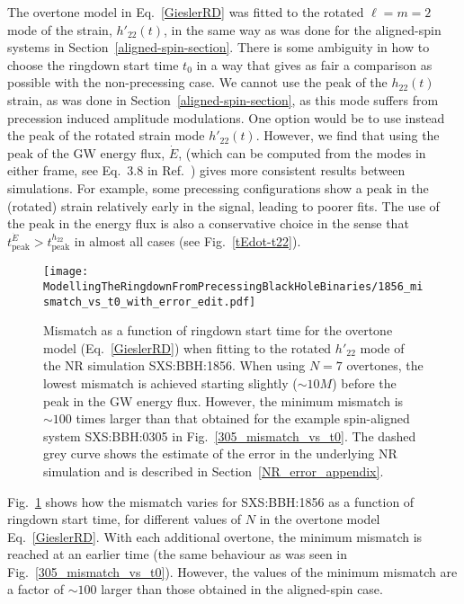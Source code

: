 The overtone model in Eq.~\ref{GieslerRD} was fitted to the rotated $\ell=m=2$ mode of the strain, $h'_{22}(t)$, in the same way as was done for the aligned-spin systems in Section~\ref{aligned-spin-section}.
There is some ambiguity in how to choose the ringdown start time $t_0$ in a way that gives as fair a comparison as possible with the non-precessing case. 
We cannot use the peak of the $h_{22}(t)$ strain, as was done in Section~\ref{aligned-spin-section}, as this mode suffers from precession induced amplitude modulations. 
One option would be to use instead the peak of the rotated strain mode $h'_{22}(t)$.
However, we find that using the peak of the GW energy flux, $\dot{E}$, (which can be computed from the modes in either frame, see Eq.~3.8 in Ref.~\cite{Ruiz:2007yx}) gives more consistent results between simulations. For example, some precessing configurations show a peak in the (rotated) strain relatively early in the signal, leading to poorer fits.
The use of the peak in the energy flux is also a conservative choice in the sense that $t_{\mathrm{peak}}^{\dot{E}} > t_{\mathrm{peak}}^{h_{22}}$ in almost all cases (see Fig.~\ref{tEdot-t22}).

\begin{figure}[t]
    \centering
    \texttt{[image: ModellingTheRingdownFromPrecessingBlackHoleBinaries/1856\_mismatch\_vs\_t0\_with\_error\_edit.pdf]}
    \caption[Mismatch as a function of ringdown start time for an overtone model fitted to SXS:BBH:1856]{
    Mismatch as a function of ringdown start time for the overtone model (Eq.~\ref{GieslerRD}) when fitting to the rotated $h'_{22}$ mode of the NR simulation SXS:BBH:1856.
    When using $N=7$ overtones, the lowest mismatch is achieved starting slightly ($\sim 10M$) before the peak in the GW energy flux.
    However, the minimum mismatch is $\sim 100$ times larger than that obtained for the example spin-aligned system SXS:BBH:0305 in Fig.~\ref{305_mismatch_vs_t0}. 
    The dashed grey curve shows the estimate of the error in the underlying NR simulation and is described in Section~\ref{NR_error_appendix}.
    }
    \label{1856_mismatch_vs_t0}
\end{figure}

Fig.~\ref{1856_mismatch_vs_t0} shows how the mismatch varies for SXS:BBH:1856 as a function of ringdown start time, for different values of $N$ in the overtone model Eq.~\ref{GieslerRD}.
With each additional overtone, the minimum mismatch is reached at an earlier time (the same behaviour as was seen in Fig.~\ref{305_mismatch_vs_t0}).
However, the values of the minimum mismatch are a factor of $\sim 100$ larger than those obtained in the aligned-spin case. 

